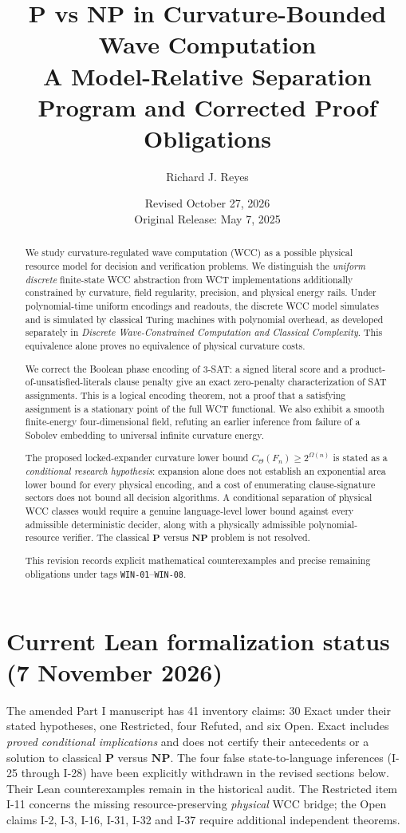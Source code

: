 \documentclass[12pt]{article}
\title{P vs NP in Curvature-Bounded Wave Computation\\
A Model-Relative Separation Program and Corrected Proof Obligations}
\author{Richard J. Reyes}
\date{Revised October 27, 2026 \\ \small Original Release: May 7, 2025}
\theoremstyle{remark}
\begin{document}
\maketitle
\begin{abstract}
We study curvature-regulated wave computation (WCC) as a possible
physical resource model for decision and verification problems. We
distinguish the \emph{uniform discrete} finite-state WCC abstraction from
WCT implementations additionally constrained by curvature, field
regularity, precision, and physical energy rails. Under polynomial-time
uniform encodings and readouts, the discrete WCC model simulates and is
simulated by classical Turing machines with polynomial overhead, as
developed separately in \emph{Discrete Wave-Constrained Computation and
Classical Complexity}. This equivalence alone proves no equivalence of
physical curvature costs.

We correct the Boolean phase encoding of $3$-SAT: a signed literal score
and a product-of-unsatisfied-literals clause penalty give an exact
zero-penalty characterization of SAT assignments. This is a logical
encoding theorem, not a proof that a satisfying assignment is a stationary
point of the full WCT functional. We also exhibit a smooth finite-energy
four-dimensional field, refuting an earlier inference from failure of a
Sobolev embedding to universal infinite curvature energy.

The proposed locked-expander curvature lower bound
$C_\Theta(F_n)\ge 2^{\Omega(n)}$ is stated as a \emph{conditional research
hypothesis}: expansion alone does not establish an exponential area
lower bound for every physical encoding, and a cost of enumerating
clause-signature sectors does not bound all decision algorithms. A
conditional separation of physical WCC classes would require a genuine
language-level lower bound against every admissible deterministic
decider, along with a physically admissible polynomial-resource verifier.
The classical $\mathbf{P}$ versus $\mathbf{NP}$ problem is not resolved.

This revision records explicit mathematical counterexamples and precise
remaining obligations under tags \texttt{WIN-01}--\texttt{WIN-08}.
\end{abstract}

\section*{Current Lean formalization status (7 November 2026)}
\label{sec:current-lean-status}
The amended Part I manuscript has 41 inventory claims:
30 Exact under their stated hypotheses, one Restricted,
four Refuted, and six Open.  Exact includes
\emph{proved conditional implications} and does
not certify their antecedents or a solution to
classical $\mathbf P$ versus $\mathbf{NP}$.
The four false state-to-language inferences
(I-25 through I-28) have been explicitly withdrawn
in the revised sections below.  Their Lean
counterexamples remain in the historical audit.
The Restricted item I-11 concerns the missing
resource-preserving \emph{physical} WCC bridge;
the Open claims I-2, I-3, I-16, I-31, I-32
and I-37 require additional independent theorems.
\end{document}
